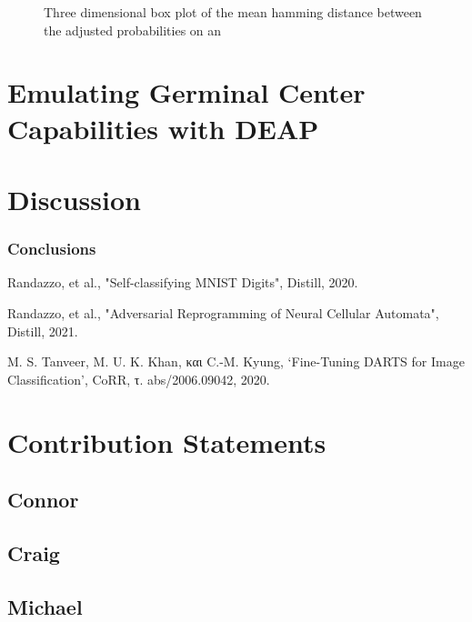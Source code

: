\documentclass[conference]{IEEEtran}
\begin{document}
\begin{figure}[htbp]
\caption{Three dimensional box plot of the mean hamming distance between the adjusted probabilities on an }
\end{figure}

\section{Emulating Germinal Center Capabilities with DEAP}



\section{Discussion}

\subsubsection{Conclusions}


\begin{thebibliography}{00}

 Randazzo, et al., "Self-classifying MNIST Digits", Distill, 2020.

 Randazzo, et al., "Adversarial Reprogramming of Neural Cellular Automata", Distill, 2021.

 M. S. Tanveer, M. U. K. Khan, και C.-M. Kyung, ‘Fine-Tuning DARTS for Image Classification’, CoRR, τ. abs/2006.09042, 2020.

\end{thebibliography}

\section*{Contribution Statements}

\subsection{Connor} 

\subsection{Craig} 

\subsection{Michael} 
\end{document}
